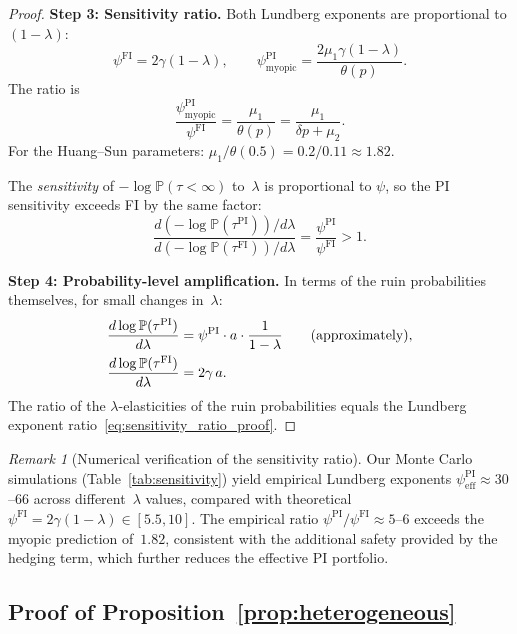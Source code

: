 \documentclass[12pt]{article}
\theoremstyle{remark}
\newtheorem{remark}[theorem]{Remark}
\theoremstyle{definition}
\newcommand{\Prob}{\mathbb{P}}
\newcommand{\FI}{\mathrm{FI}}
\newcommand{\PI}{\mathrm{PI}}
\begin{document}
\begin{proof}
\medskip\noindent\textbf{Step 3: Sensitivity ratio.}
Both Lundberg exponents are proportional to $(1-\lambda)$:
\[
  \psi^{\FI} = 2\gamma(1-\lambda), \qquad
  \psi^{\PI}_{\mathrm{myopic}} = \frac{2\mu_1\gamma(1-\lambda)}{\theta(p)}.
\]
The ratio is
\begin{equation}\label{eq:sensitivity_ratio_proof}
  \frac{\psi^{\PI}_{\mathrm{myopic}}}{\psi^{\FI}}
  = \frac{\mu_1}{\theta(p)}
  = \frac{\mu_1}{\delta p + \mu_2}.
\end{equation}
For the Huang--Sun parameters: $\mu_1/\theta(0.5) = 0.2/0.11 \approx 1.82$.

The \emph{sensitivity} of $-\log\Prob(\tau < \infty)$ to~$\lambda$ is
proportional to $\psi$, so the PI sensitivity exceeds FI by the same factor:
\begin{equation}\label{eq:sensitivity_amp}
  \frac{d(-\log\Prob(\tau^{\PI}))/d\lambda}
       {d(-\log\Prob(\tau^{\FI}))/d\lambda}
  = \frac{\psi^{\PI}}{\psi^{\FI}} > 1.
\end{equation}

\medskip\noindent\textbf{Step 4: Probability-level amplification.}
In terms of the ruin probabilities themselves, for small changes in~$\lambda$:
\begin{align}\label{eq:prob_sensitivity}
  \frac{d\log\Prob(\tau^{\PI})}{d\lambda}
  &= \psi^{\PI}\cdot a \cdot \frac{1}{1-\lambda}
  \qquad\text{(approximately)}, \\
  \frac{d\log\Prob(\tau^{\FI})}{d\lambda}
  &= 2\gamma\,a. \notag
\end{align}
The ratio of the $\lambda$-elasticities of the ruin probabilities
equals the Lundberg exponent ratio~\eqref{eq:sensitivity_ratio_proof}.
\end{proof}

\begin{remark}[Numerical verification of the sensitivity ratio]
\label{rem:sensitivity_numerical}
Our Monte Carlo simulations (Table~\ref{tab:sensitivity}) yield
empirical Lundberg exponents $\psi_{\mathrm{eff}}^{\PI} \approx 30$--$66$
across different~$\lambda$ values, compared with theoretical
$\psi^{\FI} = 2\gamma(1-\lambda) \in [5.5, 10]$.
The empirical ratio $\psi^{\PI}/\psi^{\FI} \approx 5$--$6$ exceeds
the myopic prediction of~$1.82$, consistent with the additional safety
provided by the hedging term, which further reduces the effective PI
portfolio.
\end{remark}


\subsection{Proof of Proposition~\ref{prop:heterogeneous}}\label{sec:proof_heterogeneous}
\end{document}
